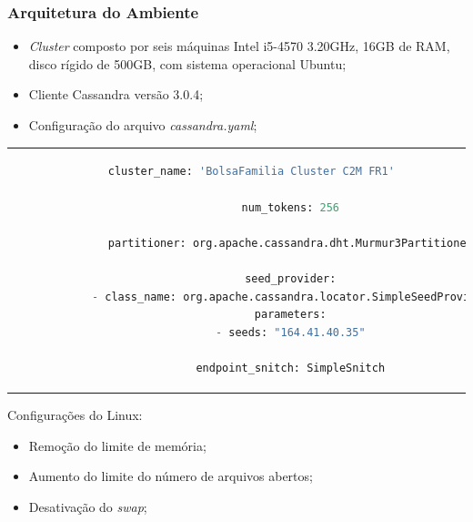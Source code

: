 \documentclass[brazil]{beamer}
\begin{document}
\begin{frame}[fragile]
		\frametitle{Arquitetura do Ambiente}
		\begin{itemize}
			\item \emph{Cluster} composto por seis máquinas Intel i5-4570 3.20GHz, 16GB de RAM, disco rígido de 500GB, com sistema operacional Ubuntu;
			\item Cliente Cassandra versão 3.0.4;
			\item Configuração do arquivo \emph{cassandra.yaml};
		\end{itemize}
	
		\begin{tabular}{c}
			\begin{lstlisting}[caption={Configuração cassandra.yaml},language=python]
			cluster_name: 'BolsaFamilia Cluster C2M FR1'
			
			num_tokens: 256
			
			partitioner: org.apache.cassandra.dht.Murmur3Partitioner
			
			seed_provider:
			- class_name: org.apache.cassandra.locator.SimpleSeedProvider
			parameters:
			- seeds: "164.41.40.35"
			
			endpoint_snitch: SimpleSnitch
			\end{lstlisting}
		\end{tabular}
	
		Configurações do Linux:
		\begin{itemize}
			\item Remoção do limite de memória;
			\item Aumento do limite do número de arquivos abertos;
			\item Desativação do \emph{swap};
		\end{itemize}
\end{frame}
\end{document}
